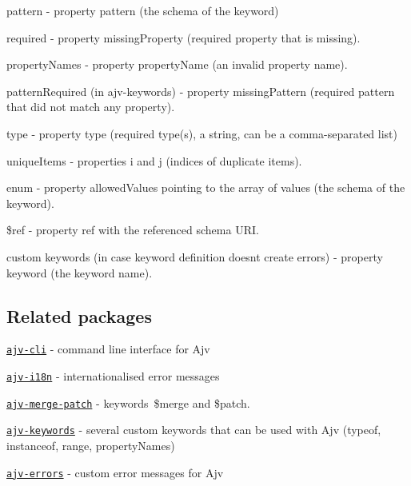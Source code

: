 \begin{DoxyItemize}
\item {\ttfamily pattern} -\/ property {\ttfamily pattern} (the schema of the keyword)
\item {\ttfamily required} -\/ property {\ttfamily missing\+Property} (required property that is missing).
\item {\ttfamily property\+Names} -\/ property {\ttfamily property\+Name} (an invalid property name).
\item {\ttfamily pattern\+Required} (in ajv-\/keywords) -\/ property {\ttfamily missing\+Pattern} (required pattern that did not match any property).
\item {\ttfamily type} -\/ property {\ttfamily type} (required type(s), a string, can be a comma-\/separated list)
\item {\ttfamily unique\+Items} -\/ properties {\ttfamily i} and {\ttfamily j} (indices of duplicate items).
\item {\ttfamily enum} -\/ property {\ttfamily allowed\+Values} pointing to the array of values (the schema of the keyword).
\item {\ttfamily \$ref} -\/ property {\ttfamily ref} with the referenced schema U\+RI.
\item custom keywords (in case keyword definition doesn\textquotesingle{}t create errors) -\/ property {\ttfamily keyword} (the keyword name).
\end{DoxyItemize}

\subsection*{Related packages}


\begin{DoxyItemize}
\item \href{https://github.com/epoberezkin/ajv-cli}{\tt ajv-\/cli} -\/ command line interface for Ajv
\item \href{https://github.com/epoberezkin/ajv-i18n}{\tt ajv-\/i18n} -\/ internationalised error messages
\item \href{https://github.com/epoberezkin/ajv-merge-patch}{\tt ajv-\/merge-\/patch} -\/ keywords \$merge and \$patch.
\item \href{https://github.com/epoberezkin/ajv-keywords}{\tt ajv-\/keywords} -\/ several custom keywords that can be used with Ajv (typeof, instanceof, range, property\+Names)
\item \href{https://github.com/epoberezkin/ajv-errors}{\tt ajv-\/errors} -\/ custom error messages for Ajv
\end{DoxyItemize}

